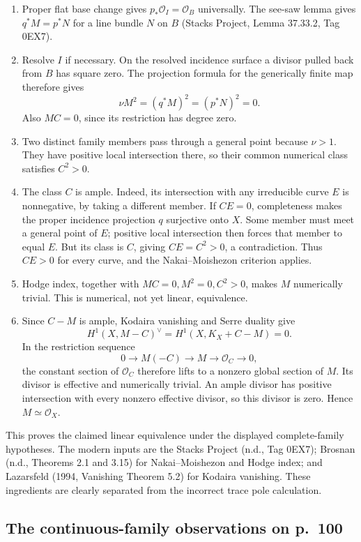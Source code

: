 \begin{enumerate}
\item
  Proper flat base change gives \(p_*\mathcal O_I=\mathcal O_B\) universally. The see-saw lemma gives \(q^*M=p^*N\) for a line bundle \(N\) on \(B\) (Stacks Project, Lemma 37.33.2, Tag 0EX7).
\item
  Resolve \(I\) if necessary. On the resolved incidence surface a divisor pulled back from \(B\) has square zero. The projection formula for the generically finite map therefore gives \[
  \nu M^2=(q^*M)^2=(p^*N)^2=0.
  \] Also \(M C=0\), since its restriction has degree zero.
\item
  Two distinct family members pass through a general point because \(\nu>1\). They have positive local intersection there, so their common numerical class satisfies \(C^2>0\).
\item
  The class \(C\) is ample. Indeed, its intersection with any irreducible curve \(E\) is nonnegative, by taking a different member. If \(CE=0\), completeness makes the proper incidence projection \(q\) surjective onto \(X\). Some member must meet a general point of \(E\); positive local intersection then forces that member to equal \(E\). But its class is \(C\), giving \(CE=C^2>0\), a contradiction. Thus \(CE>0\) for every curve, and the Nakai--Moishezon criterion applies.
\item
  Hodge index, together with \(MC=0,M^2=0,C^2>0\), makes \(M\) numerically trivial. This is numerical, not yet linear, equivalence.
\item
  Since \(C-M\) is ample, Kodaira vanishing and Serre duality give \[
  H^1(X,M-C)^\vee=H^1(X,K_X+C-M)=0.
  \] In the restriction sequence \[
  0\to M(-C)\to M\to\mathcal O_C\to0,
  \] the constant section of \(\mathcal O_C\) therefore lifts to a nonzero global section of \(M\). Its divisor is effective and numerically trivial. An ample divisor has positive intersection with every nonzero effective divisor, so this divisor is zero. Hence \(M\simeq\mathcal O_X\).
\end{enumerate}

This proves the claimed linear equivalence under the displayed complete-family hypotheses. The modern inputs are the Stacks Project (n.d., Tag 0EX7); Brosnan (n.d., Theorems 2.1 and 3.15) for Nakai--Moishezon and Hodge index; and Lazarsfeld (1994, Vanishing Theorem 5.2) for Kodaira vanishing. These ingredients are clearly separated from the incorrect trace pole calculation.

\subsection{The continuous-family observations on p.~100}

